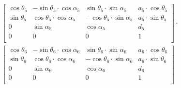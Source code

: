 \begin{multline}
\begin{bmatrix}
\cos\theta_5 & -\sin\theta_5 \cdot \cos\alpha_5 & \sin\theta_5 \cdot \sin\alpha_5 & a_5 \cdot \cos\theta_5 \\
\sin\theta_5 & \cos\theta_5 \cdot \cos\alpha_5 & -\cos\theta_5 \cdot \sin\alpha_5 & a_5 \cdot \sin\theta_5 \\
0 & \sin\alpha_5 & \cos\alpha_5 & d_5 \\
0 & 0 & 0 & 1 \\
\end{bmatrix}
 \cdot \\
\begin{bmatrix}
\cos\theta_6 & -\sin\theta_6 \cdot \cos\alpha_6 & \sin\theta_6 \cdot \sin\alpha_6 & a_6 \cdot \cos\theta_6 \\
\sin\theta_6 & \cos\theta_6 \cdot \cos\alpha_6 & -\cos\theta_6 \cdot \sin\alpha_6 & a_6 \cdot \sin\theta_6 \\
0 & \sin\alpha_6 & \cos\alpha_6 & d_6 \\
0 & 0 & 0 & 1 \\
\end{bmatrix}
\phantom{ \cdot }\\
\end{multline}
